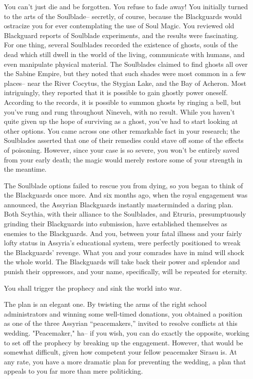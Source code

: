 \documentclass[char]{Kos}
\begin{document}
You can't just die and be forgotten. You refuse to fade away! You initially turned to the arts of the Soulblade-- secretly, of course, because the Blackguards would ostracize you for ever contemplating the use of Soul Magic. You reviewed old Blackguard reports of Soulblade experiments, and the results were fascinating. For one thing, several Soulblades recorded the existence of ghosts, souls of the dead which still dwell in the world of the living, communicate with humans, and even manipulate physical material. The Soulblades claimed to find ghosts all over the Sabine Empire, but they noted that such shades were most common in a few places-- near the River Cocytus, the Stygian Lake, and the Bay of Acheron. Most intriguingly, they reported that it is possible to gain ghostly power oneself. According to the records, it is possible to summon ghosts by ringing a bell, but you've rung and rung throughout Nineveh, with no result. While you haven't quite given up the hope of surviving as a ghost, you've had to start looking at other options. You came across one other remarkable fact in your research; the Soulblades asserted that one of their remedies could stave off some of the effects of poisoning. However, since your case is so severe, you won't be entirely saved from your early death; the magic would merely restore some of your strength in the meantime.

The Soulblade options failed to rescue you from dying, so you began to think of the Blackguards once more. And six months ago, when the royal engagement was announced, the Assyrian Blackguards instantly masterminded a daring plan. Both Scythia, with their alliance to the Soulblades, and Etruria, presumptuously grinding their Blackguards into submission, have established themselves as enemies to the Blackguards. And you, between your fatal illness and your fairly lofty status in Assyria's educational system, were perfectly positioned to wreak the Blackguards' revenge. What you and your comrades have in mind will shock the whole world. The Blackguards will take back their power and splendor and punish their oppressors, and your name, specifically, will be repeated for eternity. 

You shall trigger the prophecy and sink the world into war.

The plan is an elegant one. By twisting the arms of the right school administrators and winning some well-timed donations, you obtained a position as one of the three Assyrian ``peacemakers,'' invited to resolve conflicts at this wedding. "Peacemaker," ha-- if you wish, you can do exactly the opposite, working to set off the prophecy by breaking up the engagement. However, that would be somewhat difficult, given how competent your fellow peacemaker Sirasu is. At any rate, you have a more dramatic plan for preventing the wedding, a plan that appeals to you far more than mere politicking.
\end{document}
